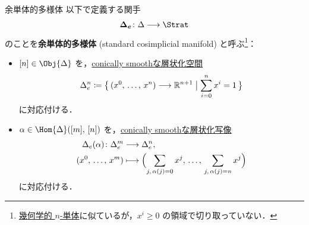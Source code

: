 \documentclass[TQFT_main]{subfiles}
\begin{document}
\begin{mydef}[label=def:standard-cosimplicial-mfd]{余単体的多様体}
    以下で定義する関手
    \begin{align}
        \bm{\Delta_e} \colon \Delta \lto \Strat
    \end{align}
    のことを\textbf{余単体的多様体} (standard cosimplicial manifold) と呼ぶ\footnote{\hyperref[def:simplicial-top]{幾何学的 $n$-単体}に似ているが，$x^i \ge 0$ の領域で切り取っていない．}：
    \begin{itemize}
        \item $[n] \in \Obj{\Delta}$ を，\hyperref[def:c-smooth]{conically smoothな層状化空間}
        \begin{align}
            \Delta_e^n \coloneqq \bigl\{\, (x^0,\, \dots,\, x^n) \longrightarrow \mathbb{R}^{n+1} \bigm| \sum_{i=0}^n x^i = 1 \,\bigr\} 
        \end{align}
        に対応付ける．
        \item $\alpha \in \Hom{\Delta}([m],\, [n])$ を，\hyperref[def:c-smooth-map]{conically smoothな層状化写像}
        \begin{align}
            \Delta_e(\alpha) \colon \Delta_e^m &\longrightarrow \Delta_e^n, \\
            (x^0,\, \dots,\, x^m) &\longmapsto \Bigl( \sum_{j,\, \alpha(j) = 0} x^j,\, \dots,\, \sum_{j,\, \alpha(j) = n} x^j \Bigr)
        \end{align}
        に対応付ける．
    \end{itemize}
\end{mydef}
\end{document}
